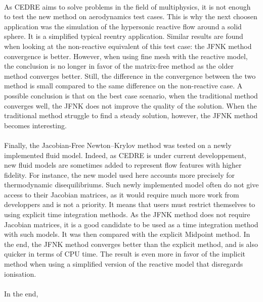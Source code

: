   \paragraph{}
  As CEDRE aims to solve problems in the field of multiphysics, it is not enough to test the new method on aerodynamics test cases.
  This is why the next choosen application was the simulation of the hypersonic reactive flow around a solid sphere.
  It is a simplified typical reentry application.
  Similar results are found when looking at the non-reactive equivalent of this test case: the JFNK method convergence is better.
  However, when using fine mesh with the reactive model, the conclusion is no longer in favor of the matrix-free method as the older method converges better.
  Still, the difference in the convergence between the two method is small compared to the same difference on the non-reactive case.
  A possible conclusion is that on the best case scenario, when the traditional method converges well, the JFNK does not improve the quality of the solution.
  When the traditional method struggle to find a steady solution, however, the JFNK method becomes interesting.

  \paragraph{}
  Finally, the Jacobian-Free Newton--Krylov method was tested on a newly implemented fluid model.
  Indeed, as CEDRE is under current developpement, new fluid models are sometimes added to represent flow features with higher fidelity.
  For instance, the new model used here accounts more precisely for thermodynamic disequilibriums.
  Such newly implemented model often do not give access to their Jacobian matrices, as it would require much more work from developpers and is not a priority.
  It means that users must restrict themselves to using explicit time integration methods.
  As the JFNK method does not require Jacobian matrices, it is a good candidate to be used as a time integration method with such models.
  It was then compared with the explicit Midpoint method.
  In the end, the JFNK method converges better than the explicit method, and is also quicker in terms of CPU time.
  The result is even more in favor of the implicit method when using a simplified version of the reactive model that disregards ionisation.

  \paragraph{}
  In the end,
